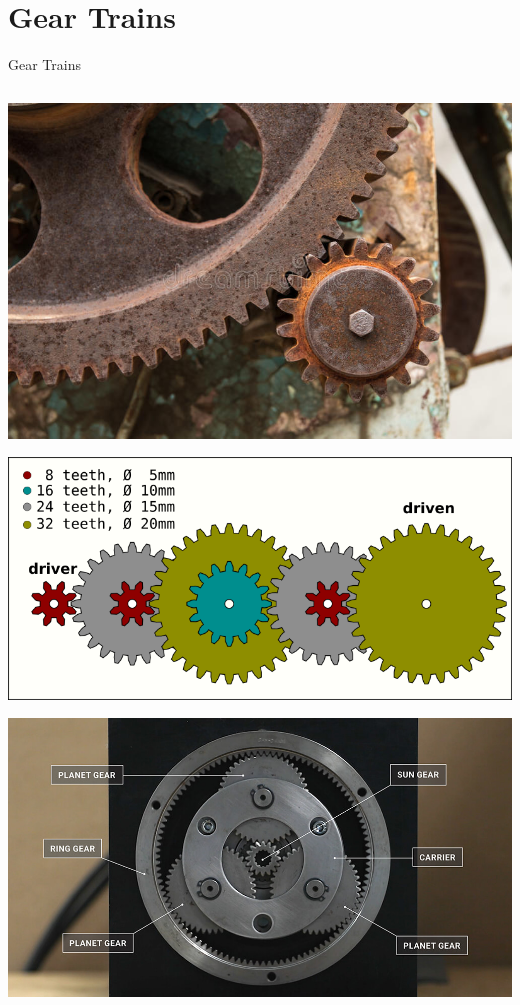 \documentclass[10pt, svgnames]{beamer}
\begin{document}
\section{Gear Trains}
\label{gear-trains}
\begin{frame}[label={sec:org873c7d3}]{Gear Trains}
\begin{columns}
\begin{column}{0.5\columnwidth}
\begin{center}
\includegraphics[width=.9\linewidth]{pictures/big-gear-small-gear.jpg}
\end{center}
\begin{center}
\includegraphics[width=.9\linewidth]{pictures/multi-gears.png}
\end{center}
\begin{center}
\includegraphics[width=.9\linewidth]{pictures/planetary-gear-comp.jpg}
\end{center}
\end{column}


\end{columns}
\end{frame}
\end{document}
